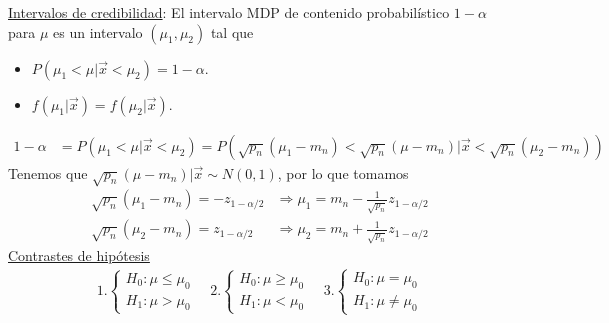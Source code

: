 \underline{Intervalos de credibilidad}: El intervalo MDP de contenido probabilístico $1-\alpha$ para $\mu$ es un intervalo $(\mu_1,\mu_2)$ tal que
\begin{itemize}
    \item $P(\mu_1 < \mu | \vec{x} < \mu_2) = 1-\alpha$.
    \item $f(\mu_1| \vec{x}) = f(\mu_2 | \vec{x})$.
\end{itemize}
\begin{align*}
    1 - \alpha & = P(\mu_1 < \mu | \vec{x} < \mu_2) = P(\sqrt{p_n}(\mu_1 - m_n) < \sqrt{p_n}(\mu - m_n) | \vec{x} < \sqrt{p_n}(\mu_2 - m_n))
\end{align*}
Tenemos que $\sqrt{p_n}(\mu - m_n) | \vec{x} \sim N(0,1)$, por lo que tomamos
\begin{align*}
    \sqrt{p_n}(\mu_1 - m_n) = - z_{1 - \alpha/2} & \Longrightarrow \mu_1 = m_n - \frac{1}{\sqrt{p_n}}z_{1 - \alpha/2} \\
    \sqrt{p_n}(\mu_2 - m_n) = z_{1 - \alpha/2}   & \Longrightarrow \mu_2 = m_n + \frac{1}{\sqrt{p_n}}z_{1 - \alpha/2}
\end{align*}
\underline{Contrastes de hipótesis}
\begin{align*}
    1. \begin{cases}
           H_0 : \mu \leq \mu_0 \\
           H_1 : \mu > \mu_0
       \end{cases} \quad     2.\begin{cases}
                                   H_0 : \mu \ge \mu_0 \\
                                   H_1 : \mu < \mu_0
                               \end{cases} \quad     3.\begin{cases}
                                                           H_0 : \mu = \mu_0 \\
                                                           H_1 : \mu \not = \mu_0
                                                       \end{cases}
\end{align*}

